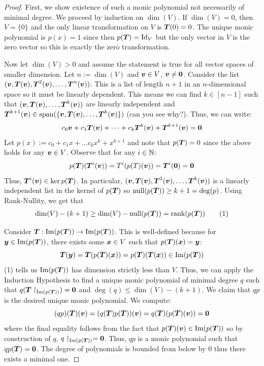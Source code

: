 \begin{proof}
    First, we show existence of such a monic polynomial not necessarily of minimal degree. We proceed by induction on $\dim(V)$. If $\dim(V)=0$, then $V=\{0\}$ and the only linear transformation on $V$ is $\boldsymbol{T}(0)=0$. The unique monic polynomial is $p(x)=1$ since then $p(\boldsymbol{T})=\text{Id}_V$ but the only vector in $V$ is the zero vector so this is exactly the zero transformation. 

    Now let $\dim(V)>0$ and assume the statement is true for all vector spaces of smaller dimension. Let $n:=\dim(V)$ and $\boldsymbol{v}\in V$, $\boldsymbol{v}\neq\boldsymbol{0}$. Consider the list $(\boldsymbol{v},\boldsymbol{T}(\boldsymbol{v}),\boldsymbol{T}^2(\boldsymbol{v}),\dots, \boldsymbol{T}^n(\boldsymbol{v}))$. This is a list of length $n+1$ in an $n$-dimensional space so it must be linearly dependent. This means we can find $k\in[n-1]$ such that $(\boldsymbol{v},\boldsymbol{T}(\boldsymbol{v}),\dots,\boldsymbol{T}^k(\boldsymbol{v}))$ are linearly independent and $\boldsymbol{T}^{k+1}(\boldsymbol{v})\in\operatorname{span}(\{\boldsymbol{v},\boldsymbol{T}(\boldsymbol{v}),\dots,\boldsymbol{T}^k(\boldsymbol{v})\})$ (can you see why?). Thus, we can write:
    \[c_0\boldsymbol{v}+c_1\boldsymbol{T}(\boldsymbol{v})+\dots+c_k\boldsymbol{T}^k(\boldsymbol{v})+\boldsymbol{T}^{k+1}(\boldsymbol{v})=\boldsymbol{0}\]
    Let $p(x):=c_0+c_1x+\dots c_kx^k+x^{k+1}$ and note that $p(\boldsymbol{T})=0$ since the above holds for any $\boldsymbol{v}\in V$. Observe that for any $i\in\mathbb{N}$:
    \[p(\boldsymbol{T})(\boldsymbol{T}^i(\boldsymbol{v}))=T^i(p(T)(\boldsymbol{v}))=\boldsymbol{T}^i(\boldsymbol{0})=\boldsymbol{0}\]
    Thus, $\boldsymbol{T}^i(\boldsymbol{v})\in\ker p(\boldsymbol{T})$. In particular, $(\boldsymbol{v},\boldsymbol{T}(\boldsymbol{v}),\boldsymbol{T}^2(\boldsymbol{v}),\dots, \boldsymbol{T}^k(\boldsymbol{v}))$ is a linearly independent list in the kernel of $p(\boldsymbol{T})$ so $\operatorname{null}(p(\boldsymbol{T}))\geq k+1=\deg(p)$. Using Rank-Nullity, we get that
    \begin{align*}
        \dim(V)-(k+1)\geq\dim(V)-\operatorname{null}(p(\boldsymbol{T}))=\operatorname{rank}(p(\boldsymbol{T}))\tag{1}
    \end{align*}

    Consider $\boldsymbol{T}:\operatorname{Im}(p(\boldsymbol{T}))\to \operatorname{Im}(p(\boldsymbol{T}))$. This is well-defined because for $\boldsymbol{y}\in\operatorname{Im}(p(\boldsymbol{T}))$, there exists some $\boldsymbol{x}\in V$ such that $p(\boldsymbol{T})(\boldsymbol{x})=\boldsymbol{y}$:
    \[\boldsymbol{T}(\boldsymbol{y})=\boldsymbol{T}(p(\boldsymbol{T})(\boldsymbol{x}))=p(\boldsymbol{T})(\boldsymbol{T}(\boldsymbol{x}))\in\operatorname{Im}(p(\boldsymbol{T}))\]
    (1) tells us $\operatorname{Im}(p(\boldsymbol{T}))$ has dimension strictly less than $V$. Thus, we can apply the Induction Hypothesis to find a unique monic polynomial of minimal degree $q$ such that $q(\boldsymbol{T}\restriction_{\operatorname{Im}(p(\boldsymbol{T}))})=\boldsymbol{0}$ and $\deg(q)\leq\dim(V)-(k+1)$.
    We claim that $qp$ is the desired unique monic polynomial. We compute:
    \[(qp)(\boldsymbol{T})(\boldsymbol{v})=(q(\boldsymbol{T})p(\boldsymbol{T}))(\boldsymbol{v})=q(\boldsymbol{T})(p(\boldsymbol{T})(\boldsymbol{v}))=\boldsymbol{0}\]
    where the final equality follows from the fact that $p(\boldsymbol{T})(\boldsymbol{v})\in\operatorname{Im}(p(\boldsymbol{T}))$ so by construction of $q$, $q\restriction_{\operatorname{Im}(p(\boldsymbol{T}))}=\boldsymbol{0}$. Thus, $qp$ is a monic polynomial such that $qp(\boldsymbol{T})=\boldsymbol{0}$. The degree of polynomials is bounded from below by $0$ thus there exists a minimal one.


\end{proof}
